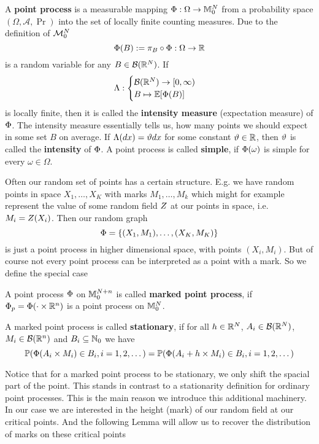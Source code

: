 \begin{definition}
	A \textbf{point process} is a measurable mapping \(\pp:\Omega\to\locFiniteMeasure\)
	from a probability space \((\Omega, \mathcal{A}, \Pr)\) into the set of
	locally finite counting measures. Due to the definition of \(\locFiniteMeasAlg\)
	\[
		\pp(B) := \pi_B\circ \pp : \Omega \to \real
	\]
	is a random variable for any \(B\in\borel(\real^\dimension)\). If
	\[
		\intensityMeas:\begin{cases}
			\borel(\real^\dimension)\to [0,\infty)\\
			B \mapsto \E[\pp(B)]
		\end{cases}
	\]
	is locally finite, then it is called the \textbf{intensity measure}
	(expectation measure) of \(\pp\). The intensity measure essentially tells
	us, how many points we should expect in some set \(B\) on average.
	If \(\intensityMeas(dx) = \intensity dx\) for some
	constant \(\intensity\in\real\), then \(\intensity\) is called the
	\textbf{intensity} of \(\pp\).
	A point process is called \textbf{simple}, if \(\pp(\omega)\) is simple
	for every \(\omega\in\Omega\).
\end{definition}

Often our random set of points has a certain structure. E.g. we have
random points in space \(X_1,\dots, X_K\) with marks \(M_1,\dots, M_k\) which
might for example represent the value of some random field \(\rf\) at our
points in space, i.e. \(M_i=\rf(X_i)\). Then our random graph 
\[
	\pp = \{ (X_1, M_1), \dots, (X_K, M_K) \}
\]
is just a point process in higher dimensional space, with points \((X_i, M_i)\).
But of course not every point process can be interpreted as a point with a mark.
So we define the special case

\begin{definition}
	A point process \(\pp\) on \(\locFiniteMeasure[\dimension+n]\) is called
	\textbf{marked point process}, if \(\pp_p = \pp(\cdot \times \real^n)\)
	is a point process on \(\locFiniteMeasure\).

	A marked point process is called \textbf{stationary}, if for all
	\(h\in\real^\dimension\), \(A_i\in\borel(\real^\dimension)\),
	\(M_i\in\borel(\real^n)\) and \(B_i\subseteq\nat_0\) we have
	\[
		\Pr(\pp(A_i\times M_i) \in B_i, i=1,2,\dots)
		= \Pr(\pp(A_i+h \times M_i)\in B_i, i=1,2,\dots)
	\]
\end{definition}

Notice that for a marked point process to be stationary, we only shift the
spacial part of the point. This stands in contrast to a stationarity definition
for ordinary point processes. This is the main reason we introduce this
additional machinery. In our case we are interested in the height (mark) of
our random field at our critical points. And the following Lemma will allow us
to recover the distribution of marks on these critical points

